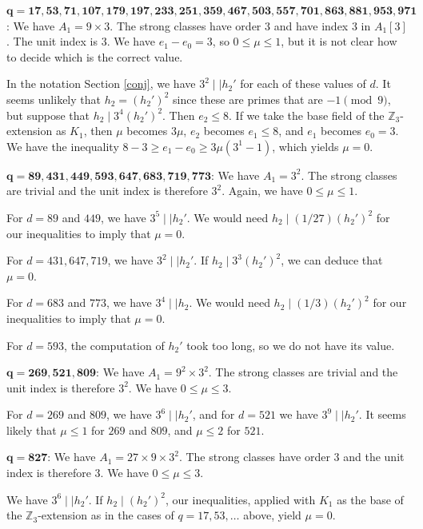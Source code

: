 \documentclass{amsart}
\begin{document}
\medskip
\noindent
$\mathbf{q= 17, 53, 71, 107, 179, 197, 233, 251, 359, 467, 503, 557, 701, 863, 881, 953, 971}$: We have $A_1=9\times 3$. The strong classes have order 3 and have index 3 in $A_1[3]$.
The unit index is 3. We have $e_1-e_0=3$, so $0\le \mu \le 1$, but it is not clear how to decide which is the correct value.

In the notation Section \ref{conj}, we have $3^2\mid\mid h_2'$ for each of these values of $d$. It seems unlikely that $h_2=(h_2')^2$ since these are primes that are $-1\pmod 9$, but suppose
that $h_2\mid 3^4 (h_2')^2$. Then $e_2\le 8$. If we take the base field of the $\mathbb Z_3$-extension as $K_1$, then $\mu$ becomes $3\mu$, $e_2$ becomes $e_1\le 8$, and $e_1$ becomes $e_0=3$.
We have the inequality $8-3\ge e_1-e_0\ge 3\mu (3^1-1)$, which yields $\mu=0$.

\medskip
\noindent
$\mathbf{q= 89, 431, 449, 593, 647, 683, 719, 773}$: We have $A_1=3^2$. The strong classes are trivial and the unit index is therefore $3^2$.  Again, we have $0\le \mu\le 1$.

For $d=89$ and $449$, we have $3^5\mid\mid h_2'$. We would need $h_2\mid (1/27) (h_2')^2$ for our inequalities to imply that $\mu=0$.  

For $d=431, 647, 719$, we have $3^2\mid\mid h_2'$. If $h_2\mid 3^3 (h_2')^2$, we can deduce that $\mu=0$. 

For $d=683$ and $773$, we have $3^4\mid\mid h_2$. We would need $h_2\mid (1/3) (h_2')^2$ for our inequalities to imply that $\mu=0$.  

For $d=593$, the computation of $h_2'$ took too long, so we do not have its value.


\medskip
\noindent
$\mathbf{q=269, 521, 809}$: We have $A_1=9^2\times 3^2$. The strong classes are trivial and the unit index is therefore $3^2$. We have $0\le \mu\le 3$.

For $d=269$ and $809$, we have $3^6\mid\mid h_2'$, and for $d=521$ we have $3^9\mid\mid h_2'$. It seems likely that $\mu\le 1$ for $269$ and $809$, and $\mu\le 2$
for $521$.

\medskip
\noindent
$\mathbf{q=827}$: We have $A_1= 27\times 9\times 3^2$. The strong classes have order 3 and the unit index is therefore $3$. We have $0\le \mu \le 3$.

We have $3^6\mid\mid h_2'$. If $h_2\mid (h_2')^2$, our inequalities, applied with $K_1$ as the base of the $\mathbb Z_3$-extension as in the cases of $q=17, 53, \dots$ above, 
 yield $\mu=0$.
\end{document}
